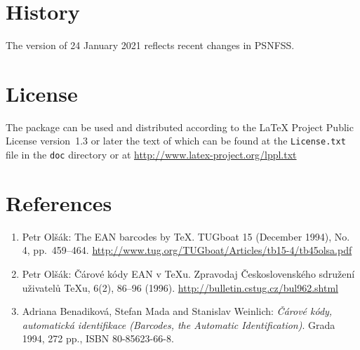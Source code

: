 \documentclass[11pt]{article}
\begin{document}
\section{History}
The version of 24 January 2021 reflects recent changes in PSNFSS.

\section{License}
The package can be used and distributed according to the LaTeX Project Public License version~1.3 or later the
text of which can be found at the \texttt{License.txt} file in the \texttt{doc} directory or at
\url{http://www.latex-project.org/lppl.txt}

\section{References}
\begin{enumerate}
\item Petr Olšák: The EAN barcodes by \TeX. TUGboat 15 (December 1994), No. 4, pp.~459--464.
\url{http://www.tug.org/TUGboat/Articles/tb15-4/tb45olsa.pdf}

\item Petr Olšák: Čárové kódy EAN v \TeX{}u. Zpravodaj Československého sdružení uživatelů \TeX{}u,
6(2), 86--96 (1996). \url{http://bulletin.cstug.cz/bul962.shtml}

\item Adriana Benadiková, Stefan Mada and Stanislav
Weinlich: \textit{Čárové kódy, automatická iden\-ti\-fi\-kace (Barcodes, the Automatic Identification)}.
Grada 1994, 272 pp., ISBN \hbox{80-85623-66-8}.
\end{enumerate}
\end{document}
